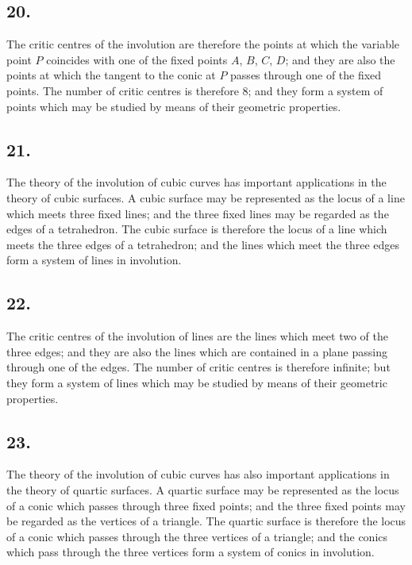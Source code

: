 \documentclass[11pt,a4paper]{article}
\theoremstyle{definition}
\begin{document}
\subsection*{20.}

The critic centres of the involution are therefore the points at which the variable point
$P$ coincides with one of the fixed points $A$, $B$, $C$, $D$; and they are also the points at which
the tangent to the conic at $P$ passes through one of the fixed points. The number of critic
centres is therefore 8; and they form a system of points which may be studied by means
of their geometric properties.

\newpage
\subsection*{21.}

The theory of the involution of cubic curves has important applications in the theory
of cubic surfaces. A cubic surface may be represented as the locus of a line which meets
three fixed lines; and the three fixed lines may be regarded as the edges of a tetrahedron.
The cubic surface is therefore the locus of a line which meets the three edges of a tetrahedron;
and the lines which meet the three edges form a system of lines in involution.

\subsection*{22.}

The critic centres of the involution of lines are the lines which meet two of the three
edges; and they are also the lines which are contained in a plane passing through one of
the edges. The number of critic centres is therefore infinite; but they form a system of
lines which may be studied by means of their geometric properties.

\newpage
\subsection*{23.}

The theory of the involution of cubic curves has also important applications in the
theory of quartic surfaces. A quartic surface may be represented as the locus of a conic
which passes through three fixed points; and the three fixed points may be regarded as
the vertices of a triangle. The quartic surface is therefore the locus of a conic which passes
through the three vertices of a triangle; and the conics which pass through the three
vertices form a system of conics in involution.
\end{document}

